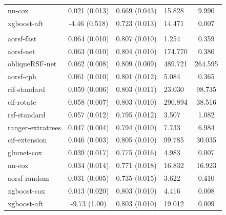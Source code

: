 \documentclass[twoside,11pt]{article}\usepackage[]{graphicx}\usepackage[]{xcolor}
\newenvironment{knitrout}{}{} %
\begin{document}
\begin{knitrout}
\begin{longtable}[t]{lcclc}
\hspace{1em}nn-cox & 0.021 (0.013) & 0.669 (0.043) & 15.828 & 9.990\\
\hspace{1em}xgboost-aft & -4.46 (0.518) & 0.723 (0.013) & 14.471 & 0.007\\
\addlinespace[0.3em]
\hline
\multicolumn{5}{l}{\textit{\textbf{MESA; coronary heart disease, n = 6785, p = 48}}}\\
\hline
\hspace{1em}aorsf-fast & 0.064 (0.010) & 0.807 (0.010) & 1.254 & 0.359\\
\hspace{1em}aorsf-net & 0.063 (0.010) & 0.804 (0.010) & 174.770 & 0.380\\
\hspace{1em}obliqueRSF-net & 0.062 (0.008) & 0.809 (0.009) & 489.721 & 264.595\\
\hspace{1em}aorsf-cph & 0.061 (0.010) & 0.801 (0.012) & 5.084 & 0.365\\
\hspace{1em}cif-standard & 0.059 (0.006) & 0.803 (0.011) & 23.030 & 98.735\\
\hspace{1em}cif-rotate & 0.058 (0.007) & 0.803 (0.010) & 290.894 & 38.516\\
\hspace{1em}rsf-standard & 0.057 (0.012) & 0.795 (0.012) & 3.507 & 1.082\\
\hspace{1em}ranger-extratrees & 0.047 (0.004) & 0.794 (0.010) & 7.733 & 6.984\\
\hspace{1em}cif-extension & 0.046 (0.003) & 0.805 (0.010) & 99.785 & 30.035\\
\hspace{1em}glmnet-cox & 0.039 (0.017) & 0.775 (0.016) & 4.983 & 0.007\\
\hspace{1em}nn-cox & 0.034 (0.014) & 0.771 (0.018) & 16.832 & 16.923\\
\hspace{1em}aorsf-random & 0.031 (0.005) & 0.735 (0.015) & 3.622 & 0.410\\
\hspace{1em}xgboost-cox & 0.013 (0.020) & 0.803 (0.010) & 4.416 & 0.008\\
\hspace{1em}xgboost-aft & -9.73 (1.00) & 0.803 (0.010) & 19.012 & 0.009\\

\end{longtable}
\end{knitrout}
\end{document}
